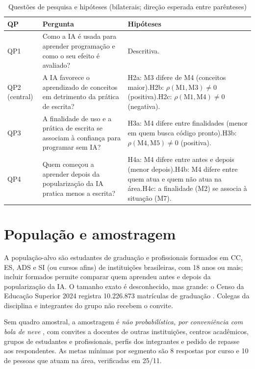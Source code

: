 \documentclass[12pt,a4paper]{article}
\newcommand{\fonte}[1]{\par\vspace{1pt}{\footnotesize\singlespacing Fonte: #1}\par\vspace{4pt}}
\newcommand{\thead}[1]{\textbf{#1}}
\newcommand{\quadro}{\begin{table}[H]\centering\footnotesize\singlespacing}
\newcommand{\fimquadro}{\end{table}}
\begin{document}
\quadro
\caption{Questões de pesquisa e hipóteses (bilaterais; direção esperada entre parênteses)}\label{tab:qp}
\begin{tabularx}{\textwidth}{@{}L{1.5cm}L{4.6cm}Y@{}}
\toprule
\thead{QP} & \thead{Pergunta} & \thead{Hipóteses} \\
\midrule
QP1 & Como a IA é usada para aprender programação e como o seu efeito é avaliado? & Descritiva. \\
QP2 (central) & A IA favorece o aprendizado de conceitos em detrimento da prática de escrita? & H2a: M3 difere de M4 (conceitos maior).\newline H2b: $\rho(\text{M1},\text{M3})\neq0$ (positiva).\newline H2c: $\rho(\text{M1},\text{M4})\neq0$ (negativa). \\
QP3 & A finalidade de uso e a prática de escrita se associam à confiança para programar sem IA? & H3a: M4 difere entre finalidades (menor em quem busca código pronto).\newline H3b: $\rho(\text{M4},\text{M5})\neq0$ (positiva). \\
QP4 & Quem começou a aprender depois da popularização da IA pratica menos a escrita? & H4a: M4 difere entre antes e depois (menor depois).\newline H4b: M4 difere entre quem atua e quem não atua na área.\newline H4c: a finalidade (M2) se associa à situação (M7). \\
\bottomrule
\end{tabularx}
\fonte{Elaborado pelos autores (2026).}
\fimquadro

\section{População e amostragem}

A população-alvo são estudantes de graduação e profissionais formados em CC, ES, ADS e SI (ou cursos afins) de instituições brasileiras, com 18 anos ou mais; incluir formados permite comparar quem aprendeu antes e depois da popularização da IA. O tamanho exato é desconhecido, mas grande: o Censo da Educação Superior 2024 registra 10.226.873 matrículas de graduação \citep{inep}. Colegas da disciplina e integrantes do grupo não recebem o convite.

Sem quadro amostral, a amostragem é \emph{não probabilística, por conveniência com bola de neve} \citep{baltes}, com convites a docentes de outras instituições, centros acadêmicos, grupos de estudantes e profissionais, perfis dos integrantes e pedido de repasse aos respondentes. As metas mínimas por segmento são 8 respostas por curso e 10 de pessoas que atuam na área, verificadas em 25/11.
\end{document}
